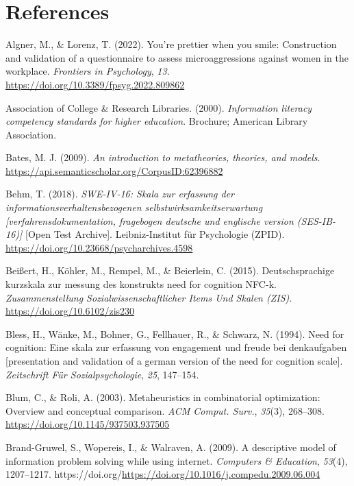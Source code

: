 \documentclass[
  12pt,
  a4paper,
  twoside]{article}
\newlength{\cslhangindent}
\newenvironment{CSLReferences}[2] %
 {\begin{list}{}{%
  \setlength{\itemindent}{0pt}
  \setlength{\leftmargin}{0pt}
  \setlength{\parsep}{0pt}
  \ifodd #1
   \setlength{\leftmargin}{\cslhangindent}
   \setlength{\itemindent}{-1\cslhangindent}
  \fi
  \setlength{\itemsep}{#2\baselineskip}}}
 {\end{list}}
\begin{document}
\section*{References}\label{references}

\label{refs}
\begin{CSLReferences}{1}{0}
Algner, M., \& Lorenz, T. (2022). You're prettier when you smile: Construction and validation of a questionnaire to assess microaggressions against women in the workplace. \emph{Frontiers in Psychology}, \emph{13}. \url{https://doi.org/10.3389/fpsyg.2022.809862}

Association of College \& Research Libraries. (2000). \emph{Information literacy competency standards for higher education}. Brochure; American Library Association.

Bates, M. J. (2009). \emph{An introduction to metatheories, theories, and models}. \url{https://api.semanticscholar.org/CorpusID:62396882}

Behm, T. (2018). \emph{SWE-IV-16: Skala zur erfassung der informationsverhaltensbezogenen selbstwirksamkeitserwartung {[}verfahrensdokumentation, fragebogen deutsche und englische version (SES-IB-16){]}} {[}Open Test Archive{]}. Leibniz-Institut für Psychologie (ZPID). \url{https://doi.org/10.23668/psycharchives.4598}

Beißert, H., Köhler, M., Rempel, M., \& Beierlein, C. (2015). Deutschsprachige kurzskala zur messung des konstrukts need for cognition NFC-k. \emph{Zusammenstellung Sozialwissenschaftlicher Items Und Skalen (ZIS)}. \url{https://doi.org/10.6102/zis230}

Bless, H., Wänke, M., Bohner, G., Fellhauer, R., \& Schwarz, N. (1994). Need for cognition: Eine skala zur erfassung von engagement und freude bei denkaufgaben {[}presentation and validation of a german version of the need for cognition scale{]}. \emph{Zeitschrift Für Sozialpsychologie}, \emph{25}, 147--154.

Blum, C., \& Roli, A. (2003). Metaheuristics in combinatorial optimization: Overview and conceptual comparison. \emph{ACM Comput. Surv.}, \emph{35}(3), 268--308. \url{https://doi.org/10.1145/937503.937505}

Brand-Gruwel, S., Wopereis, I., \& Walraven, A. (2009). A descriptive model of information problem solving while using internet. \emph{Computers \& Education}, \emph{53}(4), 1207--1217. https://doi.org/\url{https://doi.org/10.1016/j.compedu.2009.06.004}


\end{CSLReferences}
\end{document}
